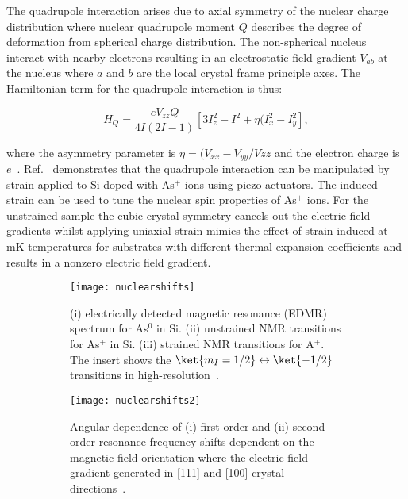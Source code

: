 The quadrupole interaction arises due to axial symmetry of the nuclear charge distribution where nuclear quadrupole moment $Q$ describes the degree of deformation from spherical charge distribution. The non-spherical nucleus interact with nearby electrons resulting in an electrostatic field gradient $V_{ab}$ at the nucleus where $a$ and $b$ are the local crystal frame principle axes. The Hamiltonian term for the quadrupole interaction is thus:

\begin{equation}
\label{eq:quadropleinteraction}
H_{Q} = \frac{e V_{zz} Q}{4I(2I-1)}\left [3I^{2}_{z}-I^{2}+\eta (I^{2}_{x} - I^{2}_{y} \right ],
\end{equation} 

where the asymmetry parameter is $\eta = (V_{xx}-V_{yy}/V{zz}$ and the electron charge is $e$~\citep{Suits2006}. Ref.~\citep{PhysRevLett.115.057601} demonstrates that the quadrupole interaction can be manipulated by strain applied to Si doped with As$^{+}$ ions using piezo-actuators. The induced strain can be used to tune the nuclear spin properties of As$^{+}$ ions. For the unstrained sample the cubic crystal symmetry cancels out the electric field gradients whilst applying uniaxial strain mimics the effect of strain induced at mK temperatures for substrates with different thermal expansion coefficients and results in a nonzero electric field gradient. 

\begin{figure}[H]
    \centering
    \begin{subfigure}[b]{0.6\textwidth}
        \centering
        \texttt{[image: nuclearshifts]}
        \caption{\label{fig:nuclearshifts}(i) electrically detected
magnetic resonance (EDMR) spectrum for As$^{0}$ in Si. (ii) unstrained NMR transitions for As$^{+}$ in Si. (iii) strained NMR transitions for A$^{+}$. The insert shows the $\ket{m_{I}=1/2} \leftrightarrow \ket{-1/2} $ transitions in high-resolution~\citep{PhysRevLett.115.057601}.}
    \end{subfigure}
        \begin{subfigure}[b]{0.6\textwidth}
        \centering
        \texttt{[image: nuclearshifts2]}
        \caption{\label{fig:nuclearshifts2} Angular dependence of (i) first-order and (ii) second-order resonance frequency shifts dependent on the magnetic field orientation where the electric field gradient generated in [111] and [100] crystal directions~\citep{PhysRevLett.115.057601}.}
    \end{subfigure}
    \caption{}
\label{fig:}
\end{figure}

